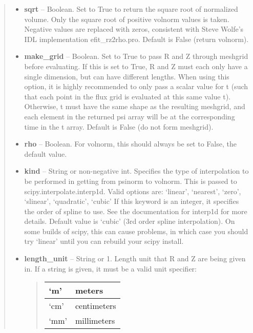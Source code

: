 \documentclass[letterpaper,10pt,english]{sphinxmanual}
\begin{document}
\begin{fulllineitems}
\begin{fulllineitems}
\begin{quote}
\begin{description}
\begin{itemize}
\item {} 
\textbf{sqrt} --
Boolean. Set to True to return the square root of normalized
volume. Only the square root of positive volnorm values is
taken. Negative values are replaced with zeros, consistent with
Steve Wolfe's IDL implementation efit\_rz2rho.pro. Default is
False (return volnorm).

\item {} 
\textbf{make\_grid} --
Boolean. Set to True to pass R and Z through meshgrid
before evaluating. If this is set to True, R and Z must each
only have a single dimension, but can have different lengths.
When using this option, it is highly recommended to only pass
a scalar value for t (such that each point in the flux grid is
evaluated at this same value t). Otherwise, t must have the
same shape as the resulting meshgrid, and each element in the
returned psi array will be at the corresponding time in the t
array. Default is False (do not form meshgrid).

\item {} 
\textbf{rho} --
Boolean. For volnorm, this should always be set to False, the
default value.

\item {} 
\textbf{kind} --
String or non-negative int. Specifies the type of interpolation
to be performed in getting from psinorm to volnorm. This is
passed to scipy.interpolate.interp1d. Valid options are:
`linear', `nearest', `zero', `slinear', `quadratic', `cubic'
If this keyword is an integer, it specifies the order of spline
to use. See the documentation for interp1d for more details.
Default value is `cubic' (3rd order spline interpolation). On
some builds of scipy, this can cause problems, in which case
you should try `linear' until you can rebuild your scipy install.

\item {} 
\textbf{length\_unit} --
String or 1. Length unit that R and Z are being given
in. If a string is given, it must be a valid unit specifier:
\begin{quote}

\begin{tabulary}{\linewidth}{|L|L|}
\hline

`m'
 & 
meters
\\\hline

`cm'
 & 
centimeters
\\\hline

`mm'
 & 
millimeters
\\\hline


\end{tabulary}
\end{quote}
\end{itemize}
\end{description}
\end{quote}
\end{fulllineitems}
\end{fulllineitems}
\end{document}
